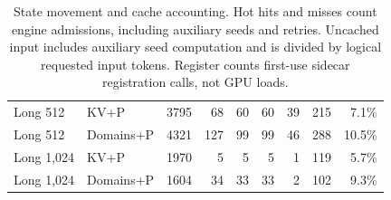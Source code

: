 \begin{table}[t]
\begin{tabular}{llrrrrrrr}
Long 512 & KV+P & 3795 & 68 & 60 & 60 & 39 & 215 & 7.1\% \\
Long 512 & Domains+P & 4321 & 127 & 99 & 99 & 46 & 288 & 10.5\% \\
Long 1,024 & KV+P & 1970 & 5 & 5 & 5 & 1 & 119 & 5.7\% \\
Long 1,024 & Domains+P & 1604 & 34 & 33 & 33 & 2 & 102 & 9.3\% \\
\bottomrule\end{tabular}
\caption{State movement and cache accounting. Hot hits and misses count engine admissions, including auxiliary seeds and retries. Uncached input includes auxiliary seed computation and is divided by logical requested input tokens. Register counts first-use sidecar registration calls, not GPU loads.}\label{tab:state}
\end{table}
